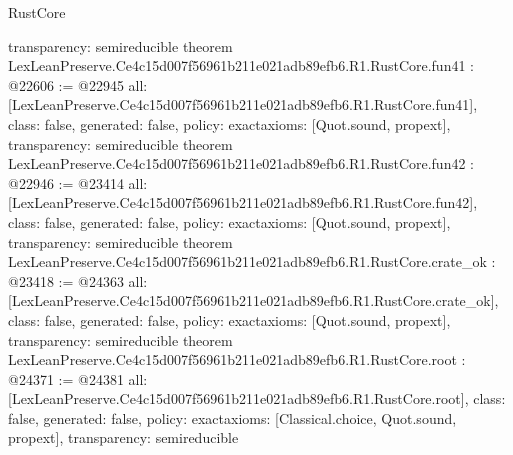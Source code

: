 \begin{lexlean}{RustCore}
\begin{coremodule}
{  transparency: semireducible
}
theorem LexLeanPreserve.Ce4c15d007f56961b211e021adb89efb6.R1.RustCore.fun41 : @22606 := @22945 {
  all: [LexLeanPreserve.Ce4c15d007f56961b211e021adb89efb6.R1.RustCore.fun41],
  class: false,
  generated: false,
  policy: exact{axioms: [Quot.sound, propext]},
  transparency: semireducible
}
theorem LexLeanPreserve.Ce4c15d007f56961b211e021adb89efb6.R1.RustCore.fun42 : @22946 := @23414 {
  all: [LexLeanPreserve.Ce4c15d007f56961b211e021adb89efb6.R1.RustCore.fun42],
  class: false,
  generated: false,
  policy: exact{axioms: [Quot.sound, propext]},
  transparency: semireducible
}
theorem LexLeanPreserve.Ce4c15d007f56961b211e021adb89efb6.R1.RustCore.crate_ok : @23418 := @24363 {
  all: [LexLeanPreserve.Ce4c15d007f56961b211e021adb89efb6.R1.RustCore.crate_ok],
  class: false,
  generated: false,
  policy: exact{axioms: [Quot.sound, propext]},
  transparency: semireducible
}
theorem LexLeanPreserve.Ce4c15d007f56961b211e021adb89efb6.R1.RustCore.root : @24371 := @24381 {
  all: [LexLeanPreserve.Ce4c15d007f56961b211e021adb89efb6.R1.RustCore.root],
  class: false,
  generated: false,
  policy: exact{axioms: [Classical.choice, Quot.sound, propext]},
  transparency: semireducible
}


\end{coremodule}
\end{lexlean}
